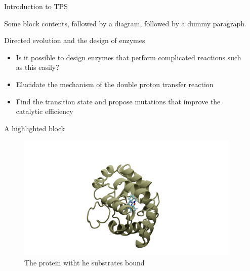 \documentclass[final]{beamer}
\newlength{\sepwidth}
\newlength{\colwidth}
\newcommand{\separatorcolumn}{\begin{column}{\sepwidth}\end{column}}
\begin{document}
\begin{frame}[t]
\begin{columns}[t]
\separatorcolumn

\begin{column}{\colwidth}

  \begin{block}{Introduction to TPS}

    Some block contents, followed by a diagram, followed by a dummy paragraph.


    

  \end{block}

  \begin{block}{Directed evolution and the design of enzymes}

    \begin{itemize}
      \item Is it possible to design enzymes that perform complicated reactions such as this easily?
      \item Elucidate the mechanism of the double proton transfer reaction 
      \item Find the transition state and propose mutations that improve the catalytic efficiency
    \end{itemize}

  \end{block}

  \begin{block}{A highlighted block}
    \begin{figure}
        \centering
        \includegraphics[scale=0.5]{figures/reac-121.png}
        \caption{The protein witht he substrates bound}
    \end{figure}


\end{block}
\end{column}
\end{columns}
\end{frame}
\end{document}
